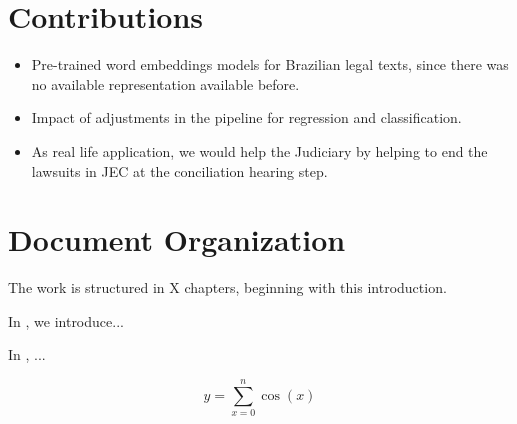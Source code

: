 


\section{Contributions}

\begin{itemize}[noitemsep]
    \item Pre-trained word embeddings models for Brazilian legal texts, since there was no available representation available before.
    \item Impact of adjustments in the pipeline for regression and classification.
    \item As real life application, we would help the Judiciary by helping to end the lawsuits in JEC at the conciliation hearing step.
\end{itemize}


\section{Document Organization}

The work is structured in X chapters, beginning with this introduction.

In , we introduce...

In , ...


\begin{equation}
    y = \sum_{x=0}^{n}\cos(x)
\end{equation}
















